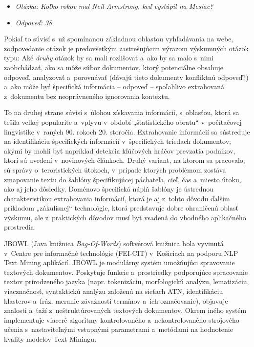 \begin{multicols}{2}
\begin{itemize}
	\item[] \textit{Otázka: Koľko rokov mal
Neil Armstrong, keď vystúpil na Mesiac?}
	\item[] \textit{Odpoveď: 38.}
\end{itemize}
Pokiaľ to súvisí
s~už spomínanou základnou oblasťou vyhľadávania na webe,
zodpovedanie otázok je predovšetkým zastrešujúcim výrazom
výskumných otázok typu: Aké \emph{druhy} otázok by sa mali
rozlišovať a~ako by sa malo s~nimi zaobchádzať, ako sa môže súbor
dokumentov, ktorý potenciálne obsahuje odpoveď, analyzovať
a~porovnávať (dávajú tieto dokumenty konfliktnú odpoveď?) a~ako
môže byť špecifická informácia – odpoveď – spoľahlivo
extrahovaná z~dokumentu bez neoprávneného ignorovania kontextu. 

To na druhej strane súvisí s~úlohou získavania informácií, s~oblasťou, ktorá sa tešila veľkej popularite a~vplyvu v~období „štatistického obratu“ v~počítačovej lingvistike v~raných 90. rokoch 20. storočia. Extrahovanie informácií sa sústreďuje na identifikáciu špecifických informácií v~špecifických triedach dokumentov; akými by mohli byť napríklad detekcia kľúčových hráčov prevzatia podnikov, ktorí sú uvedení v~novinových článkoch. Druhý variant, na ktorom sa pracovalo, sú správy o~teroristických útokoch, v~prípade ktorých problémom zostáva zmapovanie textu do šablóny špecifikujúcej páchateľa, cieľ, čas a~miesto útoku, ako aj jeho dôsledky. Doménovo špecifická náplň šablóny je ústrednou charakteristikou extrahovania informácií, ktorá je aj z~tohto dôvodu ďalším príkladom „zákulisnej“ technológie, ktorá predstavuje dobre ohraničenú oblasť výskumu, ale z~praktických dôvodov musí byť vsadená do vhodného aplikačného prostredia. 


JBOWL (Java knižnica \emph{Bag-Of-Words}) softvérová knižnica bola vyvinutá v~Centre pre informačné technológie (FEI-CIT) v~Košiciach na podporu NLP Text Mining aplikácií. JBOWL je modulárny systém umožňujúci spravovanie textových dokumentov. Poskytuje funkcie a~prostriedky podporujúce spracovanie textov prirodzeného jazyka (napr. tokenizáciu, morfologickú analýzu, lematizáciu, viacznačnosť, syntaktickú analýzu založenú na sieťach ATN, identifikáciu klasterov a~fráz, meranie závažnosti termínov a~ich označovanie), objavuje znalosti a~ťaží z~neštruktúrovaných textových dokumentov. Okrem iného systém implementuje viaceré algoritmy kontrolovaného a~nekontrolovaného strojového učenia s~nastaviteľnými vstupnými parametrami a~metódami na hodnotenie kvality modelov Text Miningu.


\end{multicols}
